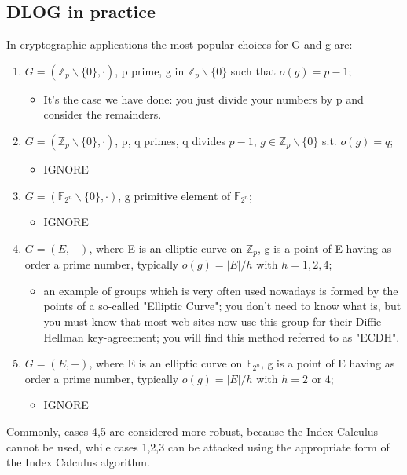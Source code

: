 \documentclass[a4paper, 10pt, titlepage]{article}
\begin{document}
\subsection{DLOG in practice}
In cryptographic applications the most popular choices for G and g are:
\begin{enumerate}
\item $G = (\mathbb{Z}_p \backslash \{0\}, \cdot)$, p prime, g in $\mathbb{Z}_p \backslash \{0\}$ such that $o(g) = p - 1$;
\begin{itemize}
\item It's the case we have done: you just divide your numbers by p and consider the remainders.
\end{itemize}
\item $G = (\mathbb{Z}_p \backslash \{0\}, \cdot)$, p, q primes, q divides $p - 1$, $g \in \mathbb{Z}_p \backslash \{0\}$ s.t. $o(g) = q$;
\begin{itemize}
\item IGNORE
\end{itemize}
\item $G = (\mathbb{F}_{2^n} \backslash \{0\}, \cdot)$, g primitive element of $\mathbb{F}_{2^n}$;
\begin{itemize}
\item IGNORE
\end{itemize}
\item $G = (E,+)$, where E is an elliptic curve on $\mathbb{Z}_p$, g is a point of E having as order a prime number, typically $o(g) = |E|/h$ with $h = 1, 2, 4$;
\begin{itemize}
\item an example of groups which is very often used nowadays is formed by the points of a so-called "Elliptic Curve"; you don't need to know what is, but you must know that most web sites now use this group for their Diffie-Hellman key-agreement; you will find this method referred to as "ECDH".
\end{itemize}
\item $G = (E,+)$, where E is an elliptic curve on $\mathbb{F}_{2^n}$, g is a point of E having as order a prime number, typically $o(g) = |E|/h$ with $h = 2$ or $4$;
\begin{itemize}
\item IGNORE
\end{itemize}
\end{enumerate}
Commonly, cases 4,5 are considered more robust, because the Index
Calculus cannot be used, while cases 1,2,3 can be attacked using the
appropriate form of the Index Calculus algorithm.
\end{document}
